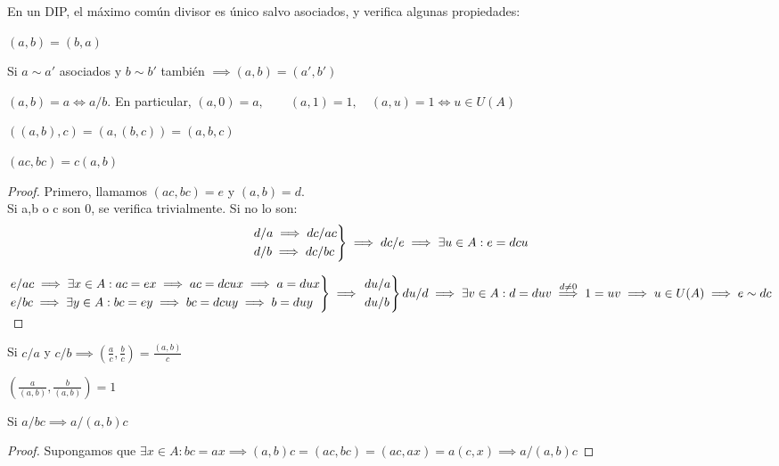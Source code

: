 En un DIP, el máximo común divisor es único salvo asociados, y verifica algunas propiedades:
\begin{nlist}

	\item $(a,b) = (b,a)$

	\item Si $a \sim a'$ asociados y $b \sim b'$ también $\implies (a,b) = (a',b')$

	\item $(a,b) = a \iff a/b$. En particular, $(a,0) = a, \quad  \quad (a,1) = 1, \quad (a,u) = 1 \iff u \in U(A)$

	\item $((a,b),c) = (a,(b,c)) = (a,b,c)$
	\item $(ac,bc) = c(a,b)$\\
	\begin{proof}
	Primero, llamamos $(ac,bc) = e$ y $(a,b) = d$.\\
	Si a,b o c son 0, se verifica trivialmente. Si no lo son:\\
	\[
	\begin{rcases}
	d/a \implies dc/ac\\
	d/b \implies dc/bc\\
\end{rcases} \implies dc/e \implies \exists u \in A : e = dcu
	\]

	$\begin{rcases}e / ac \implies \exists x \in A : ac = ex \implies ac = dcux \implies a = dux\\
	e/bc\implies \exists y \in A : bc = ey \implies bc = dcuy \implies b = duy\end{rcases} \implies \begin{rcases}du/a\\du/b\end{rcases} du/d \\\implies \exists v \in A : d = duv \stackrel{d\ne 0}{\implies} 1=uv \implies u\in U(A) \implies e \sim  dc$


\end{proof}

	\item Si $c/a$ y $c/b\implies \left(\frac{a}{c},\frac{b}{c}\right) =  \frac{(a,b)}{c}$

	\item
	$\left(\frac{a}{(a,b)}, \frac{b}{(a,b)}\right) = 1$

	\item Si $a/bc \implies a/(a,b)c$\\
	\begin{proof}
	Supongamos que $\exists x \in A : bc = ax  \implies (a,b)c = (ac,bc) = (ac,ax) = a(c,x) \implies a/(a,b)c$


\end{proof}
\end{nlist}
